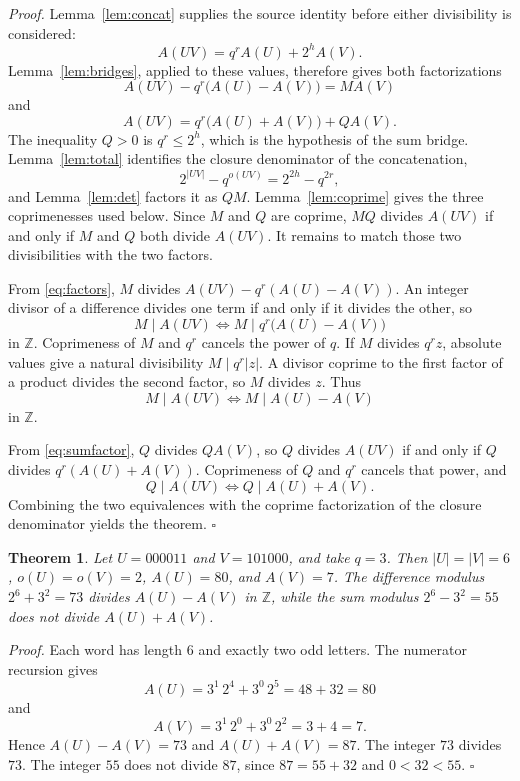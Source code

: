 \documentclass[11pt,letterpaper]{article}
\newcommand{\Z}{\mathbb{Z}}
\newtheorem{theorem}{Theorem}
\newenvironment{proof}{\noindent\textit{Proof.}}{\hfill\(\square\)}
\begin{document}
\begin{proof}
Lemma~\ref{lem:concat} supplies the source identity before either divisibility is considered:
\[
A(UV)=q^r A(U)+2^h A(V).
\]
Lemma~\ref{lem:bridges}, applied to these values, therefore gives both factorizations
\begin{equation}
\label{eq:factors}
A(UV)-q^r\bigl(A(U)-A(V)\bigr)=M A(V)
\end{equation}
and
\begin{equation}
\label{eq:sumfactor}
A(UV)=q^r\bigl(A(U)+A(V)\bigr)+Q A(V).
\end{equation}
The inequality \(Q>0\) is \(q^r\le 2^h\), which is the hypothesis of the sum bridge. Lemma~\ref{lem:total} identifies the closure denominator of the concatenation,
\[
2^{|UV|}-q^{o(UV)}=2^{2h}-q^{2r},
\]
and Lemma~\ref{lem:det} factors it as \(QM\). Lemma~\ref{lem:coprime} gives the three coprimenesses used below. Since \(M\) and \(Q\) are coprime, \(MQ\) divides \(A(UV)\) if and only if \(M\) and \(Q\) both divide \(A(UV)\). It remains to match those two divisibilities with the two factors.

From \eqref{eq:factors}, \(M\) divides \(A(UV)-q^r(A(U)-A(V))\). An integer divisor of a difference divides one term if and only if it divides the other, so
\[
M\mid A(UV)\iff M\mid q^r\bigl(A(U)-A(V)\bigr)
\]
in \(\Z\). Coprimeness of \(M\) and \(q^r\) cancels the power of \(q\). If \(M\) divides \(q^r z\), absolute values give a natural divisibility \(M\mid q^r|z|\). A divisor coprime to the first factor of a product divides the second factor, so \(M\) divides \(z\). Thus
\[
M\mid A(UV)\iff M\mid A(U)-A(V)
\]
in \(\Z\).

From \eqref{eq:sumfactor}, \(Q\) divides \(QA(V)\), so \(Q\) divides \(A(UV)\) if and only if \(Q\) divides \(q^r(A(U)+A(V))\). Coprimeness of \(Q\) and \(q^r\) cancels that power, and
\[
Q\mid A(UV)\iff Q\mid A(U)+A(V).
\]
Combining the two equivalences with the coprime factorization of the closure denominator yields the theorem.
\end{proof}

\begin{theorem}
\label{thm:separate}
Let \(U=000011\) and \(V=101000\), and take \(q=3\). Then \(|U|=|V|=6\), \(o(U)=o(V)=2\), \(A(U)=80\), and \(A(V)=7\). The difference modulus \(2^6+3^2=73\) divides \(A(U)-A(V)\) in \(\Z\), while the sum modulus \(2^6-3^2=55\) does not divide \(A(U)+A(V)\).
\end{theorem}

\begin{proof}
Each word has length \(6\) and exactly two odd letters. The numerator recursion gives
\[
A(U)=3^{1}\,2^{4}+3^{0}\,2^{5}=48+32=80
\]
and
\[
A(V)=3^{1}\,2^{0}+3^{0}\,2^{2}=3+4=7.
\]
Hence \(A(U)-A(V)=73\) and \(A(U)+A(V)=87\). The integer \(73\) divides \(73\). The integer \(55\) does not divide \(87\), since \(87=55+32\) and \(0<32<55\).
\end{proof}
\end{document}

